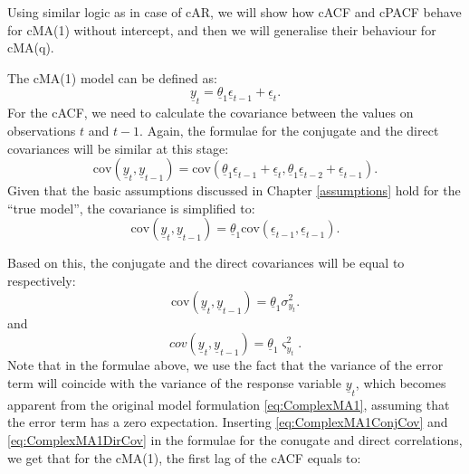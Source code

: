 \documentclass[
]{book}
\begin{document}
Using similar logic as in case of cAR, we will show how cACF and cPACF behave for cMA(1) without intercept, and then we will generalise their behaviour for cMA(q).

The cMA(1) model can be defined as:
\begin{equation}
    \underline{y}_t = \underline{\theta}_1 \underline{\epsilon}_{t-1} + \underline{\epsilon}_t .
    \label{eq:ComplexMA1}
\end{equation}
For the cACF, we need to calculate the covariance between the values on observations \(t\) and \(t-1\). Again, the formulae for the conjugate and the direct covariances will be similar at this stage:
\begin{equation}
    \mathrm{cov} \left(\underline{y}_t, \underline{y}_{t-1} \right) = \mathrm{cov}\left( \underline{\theta}_1 \underline{\epsilon}_{t-1} + \underline{\epsilon}_t, \underline{\theta}_1 \underline{\epsilon}_{t-2} + \underline{\epsilon}_{t-1} \right).
    \label{eq:ComplexMA1Step1}
\end{equation}
Given that the basic assumptions discussed in Chapter \ref{assumptions} hold for the ``true model'', the covariance is simplified to:
\begin{equation}
    \mathrm{cov} \left(\underline{y}_t, \underline{y}_{t-1} \right) = \underline{\theta}_1 \mathrm{cov}\left( \underline{\epsilon}_{t-1}, \underline{\epsilon}_{t-1} \right).
    \label{eq:ComplexMA1Step2}
\end{equation}

Based on this, the conjugate and the direct covariances will be equal to respectively:
\begin{equation}
    \mathrm{cov} \left(\underline{y}_t, \underline{y}_{t-1} \right) = \underline{\theta}_1 \sigma^2_{y_t}.
    \label{eq:ComplexMA1ConjCov}
\end{equation}
and
\begin{equation}
    {cov} \left(\underline{y}_t, \underline{y}_{t-1} \right) = \underline{\theta}_1 \varsigma^2_{y_t}.
    \label{eq:ComplexMA1DirCov}
\end{equation}
Note that in the formulae above, we use the fact that the variance of the error term will coincide with the variance of the response variable \(\underline{y}_t\), which becomes apparent from the original model formulation \eqref{eq:ComplexMA1}, assuming that the error term has a zero expectation. Inserting \eqref{eq:ComplexMA1ConjCov} and \eqref{eq:ComplexMA1DirCov} in the formulae for the conugate and direct correlations, we get that for the cMA(1), the first lag of the cACF equals to:
\end{document}
